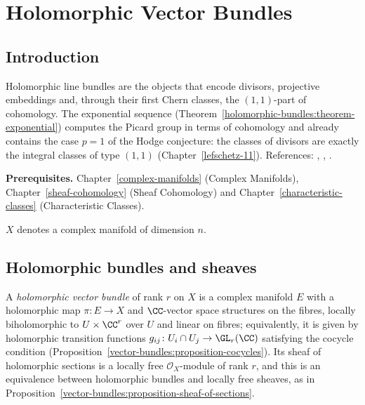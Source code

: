 \chapter{Holomorphic Vector Bundles}\label{holomorphic-bundles}

\section{Introduction}\label{holomorphic-bundles:section-introduction}

Holomorphic line bundles are the objects that encode divisors, projective embeddings and, through their first Chern classes, the
$(1,1)$-part of cohomology. The exponential sequence (Theorem~\ref{holomorphic-bundles:theorem-exponential}) computes the Picard
group in terms of cohomology and already contains the case $p = 1$ of the Hodge conjecture: the classes of divisors are exactly the
integral classes of type $(1,1)$ (Chapter~\ref{lefschetz-11}). References: \cite[Chapter 1]{griffiths-harris},
\cite[Chapters 2--4]{huybrechts-complex}, \cite[Chapter 4]{voisin-hodge-1}.

\noindent\textbf{Prerequisites.} Chapter~\ref{complex-manifolds} (Complex Manifolds), Chapter~\ref{sheaf-cohomology} (Sheaf
Cohomology) and Chapter~\ref{characteristic-classes} (Characteristic Classes).

$X$ denotes a complex manifold of dimension $n$.

\section{Holomorphic bundles and sheaves}\label{holomorphic-bundles:section-bundles}

\begin{definition}\label{holomorphic-bundles:definition-holomorphic-bundle}
A \emph{holomorphic vector bundle} of rank $r$ on $X$ is a complex manifold $E$ with a holomorphic map $\pi \colon E \to X$ and $\CC$-vector space structures on the fibres, locally biholomorphic to
$U \times \CC^r$ over $U$ and linear on fibres; equivalently, it is given by holomorphic transition functions $g_{ij} \colon U_i \cap U_j \to \GL_r(\CC)$ satisfying the cocycle condition
(Proposition~\ref{vector-bundles:proposition-cocycles}). Its sheaf of holomorphic sections is a locally free $\mathcal{O}_X$-module of rank $r$, and this is an equivalence between holomorphic bundles and
locally free sheaves, as in Proposition~\ref{vector-bundles:proposition-sheaf-of-sections}.
\end{definition}

